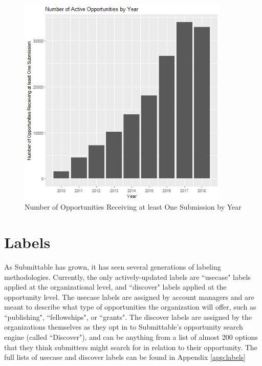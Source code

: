 \documentclass[]{report}   %
\begin{document}
\begin{figure}
    \centering
    \begin{minipage}{0.45\textwidth}
        \centering
        \includegraphics[width=0.9\textwidth]{activeForms_plot.jpg} %
        \caption{Number of Opportunities Receiving at least One Submission by Year}
	  \label{fig:activeForms}
    \end{minipage}\hfill
\end{figure}
\FloatBarrier

\section{Labels}
As Submittable has grown, it has seen several generations of labeling methodologies. Currently, the only actively-updated labels are ``usecase" labels applied at the organizational level, and ``discover" labels applied at the opportunity level. The usecase labels are assigned by account managers and are meant to describe what type of opportunities the organization will offer, such as ``publishing", ``fellowships", or ``grants". The discover labels are assigned by the organizations themselves as they opt in to Submittable's opportunity search engine (called ``Discover"), and can be anything from a list of almost 200 options that they think submitters might search for in relation to their opportunity. The full lists of usecase and discover labels can be found in Appendix \ref{app:labels}
\end{document}
